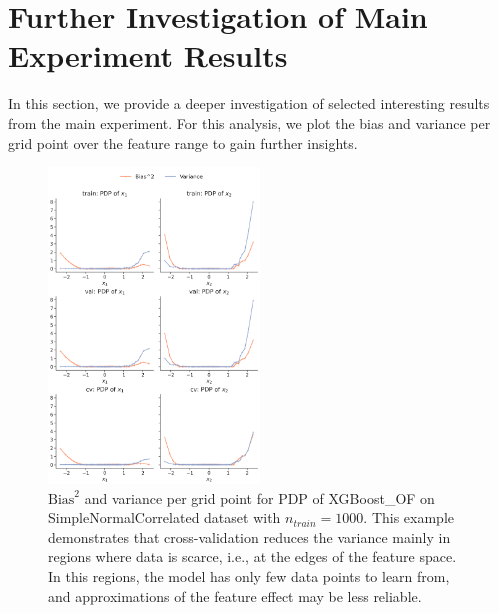\documentclass[runningheads]{llncs}
\begin{document}
\clearpage
\section{Further Investigation of Main Experiment Results}\label{app:main-study-further-investigation}

In this section, we provide a deeper investigation of selected interesting results from the main experiment.
For this analysis, we plot the bias and variance per grid point over the feature range to gain
further insights.

\begin{figure}
    \centering
    \includegraphics[width=0.5\textwidth]{img/further_investigation/snc_pdp_XGBoost_OF_1000.png}
    \caption{$\text{Bias}^2$ and variance per grid point for PDP of XGBoost\_OF on SimpleNormalCorrelated dataset with $n_{train} = 1000$.
        This example demonstrates that cross-validation reduces the variance mainly in regions where data is scarce, i.e.,
        at the edges of the feature space. In this regions, the model has only few data points to learn from, and approximations
        of the feature effect may be less reliable.}
    \label{fig:further-pdp-xgb-snc}  %
\end{figure}
\end{document}

